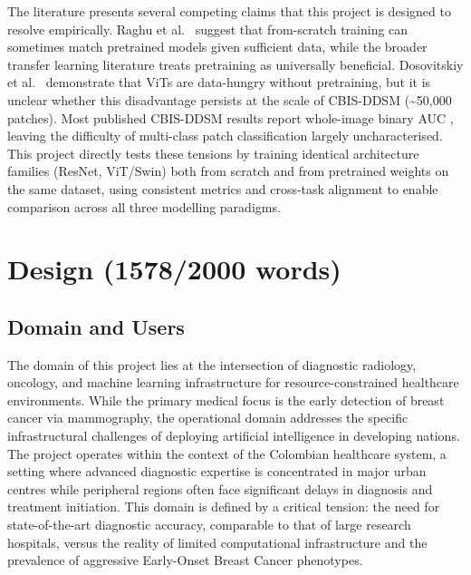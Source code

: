 \documentclass[justified,notoc,openany]{tufte-book}
\begin{document}
The literature presents several competing claims that this project is designed to resolve empirically. Raghu et al.~\cite{Raghu2019} suggest that from-scratch training can sometimes match pretrained models given sufficient data, while the broader transfer learning literature treats pretraining as universally beneficial. Dosovitskiy et al.~\cite{Dosovitskiy2021} demonstrate that ViTs are data-hungry without pretraining, but it is unclear whether this disadvantage persists at the scale of CBIS-DDSM (\textasciitilde50,000 patches). Most published CBIS-DDSM results report whole-image binary AUC \cite{Shen2017}, leaving the difficulty of multi-class patch classification largely uncharacterised. This project directly tests these tensions by training identical architecture families (ResNet, ViT/Swin) both from scratch and from pretrained weights on the same dataset, using consistent metrics and cross-task alignment to enable comparison across all three modelling paradigms.

\newpage

\chapter{Design (1578/2000 words)}\label{design-15782000-words}

\section{Domain and Users}\label{domain-and-users}

The domain of this project lies at the intersection of diagnostic radiology, oncology, and machine learning infrastructure for resource-constrained healthcare environments. While the primary medical focus is the early detection of breast cancer via mammography, the operational domain addresses the specific infrastructural challenges of deploying artificial intelligence in developing nations. The project operates within the context of the Colombian healthcare system, a setting where advanced diagnostic expertise is concentrated in major urban centres while peripheral regions often face significant delays in diagnosis and treatment initiation. This domain is defined by a critical tension: the need for state-of-the-art diagnostic accuracy, comparable to that of large research hospitals, versus the reality of limited computational infrastructure and the prevalence of aggressive Early-Onset Breast Cancer phenotypes.
\end{document}
